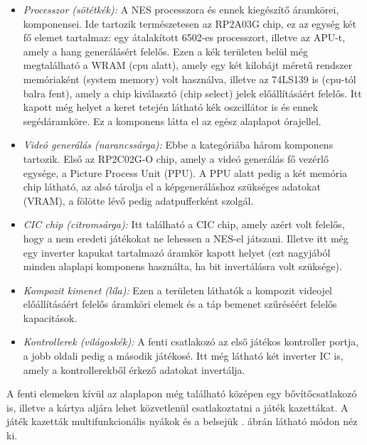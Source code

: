 \begin{itemize}
	\item \emph{Processzor (sötétkék):} A NES processzora és ennek kiegészítő áramkörei, komponensei. Ide tartozik természetesen az RP2A03G chip, ez az egység két fő elemet tartalmaz: egy átalakított 6502-es processzort, illetve az APU-t, amely a hang generálásért felelős. Ezen a kék területen belül még megtalálható a WRAM (cpu alatt), amely egy két kilobájt méretű rendszer memóriaként (system memory) volt használva, illetve az 74LS139 is (cpu-tól balra fent), amely a chip kiválasztó (chip select) jelek előállításáért felelős. Itt kapott még helyet a keret tetején látható kék oszcillátor is és ennek segédáramköre. Ez a komponens látta el az egész alaplapot órajellel.
	\item \emph{Videó generálás (narancssárga):} Ebbe a kategóriába három komponens tartozik. Első az RP2C02G-O chip, amely a videó generálás fő vezérlő egysége, a Picture Process Unit (PPU). A PPU alatt pedig a két memória chip látható, az alsó tárolja el a képgeneráláshoz szükséges adatokat (VRAM), a fölötte lévő pedig adatpufferként szolgál.
	\item \emph{CIC chip (citromsárga):} Itt található a CIC chip, amely azért volt felelős, hogy a nem eredeti játékokat ne lehessen a NES-el játszani. Illetve itt még egy inverter kapukat tartalmazó áramkör kapott helyet (ezt nagyjából minden alaplapi komponens használta, ha bit invertálásra volt szüksége). 
	\item \emph{Kompozit kimenet (lila):} Ezen a területen láthatók a kompozit videojel előállításáért felelős áramköri elemek és a táp bemenet szűréséért felelős kapacitások.
	\item \emph{Kontrollerek (világoskék):} A fenti csatlakozó az első játékos kontroller portja, a jobb oldali pedig a második játékosé. Itt még látható két inverter IC is, amely a kontrollerekből érkező adatokat invertálja.
\end{itemize}

A fenti elemeken kívül az alaplapon még található középen egy bővítőcsatlakozó is, illetve a kártya aljára lehet közvetlenül csatlakoztatni a játék kazettákat. A játék kazetták multifunkcionális nyákok és a belsejük . ábrán látható módon néz ki. 

